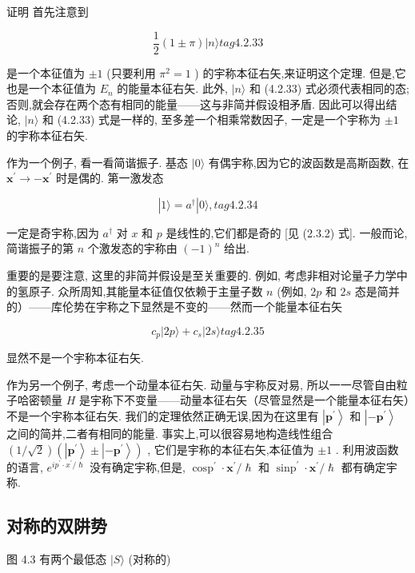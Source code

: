 证明 首先注意到

$$
\frac{1}{2}\left( {1 \pm \pi }\right) |n\rangle tag{4. 2.33}
$$

是一个本征值为 $\pm 1$ (只要利用 ${\pi }^{2} = 1$ ) 的宇称本征右矢,来证明这个定理. 但是,它也是一个本征值为 ${E}_{n}$ 的能量本征右矢. 此外, $|n\rangle$ 和 (4.2.33) 式必须代表相同的态; 否则,就会存在两个态有相同的能量——这与非简并假设相矛盾. 因此可以得出结论, $|n\rangle$ 和 (4.2.33) 式是一样的, 至多差一个相乘常数因子, 一定是一个宇称为 $\pm 1$ 的宇称本征右矢.

作为一个例子, 看一看简谐振子. 基态 $|0\rangle$ 有偶宇称,因为它的波函数是高斯函数, 在 ${\mathbf{x}}^{\prime } \rightarrow - {\mathbf{x}}^{\prime }$ 时是偶的. 第一激发态

$$
\left| {1\rangle = {a}^{ \dagger }}\right| 0\rangle , tag{4. 2.34}
$$

一定是奇宇称,因为 ${a}^{ \dagger }$ 对 $x$ 和 $p$ 是线性的,它们都是奇的 [见 (2.3.2) 式]. 一般而论, 简谐振子的第 $n$ 个激发态的宇称由 ${\left( -1\right) }^{n}$ 给出.

重要的是要注意, 这里的非简并假设是至关重要的. 例如, 考虑非相对论量子力学中的氢原子. 众所周知,其能量本征值仅依赖于主量子数 $n$ (例如, ${2p}$ 和 ${2s}$ 态是简并的）——库伦势在宇称之下显然是不变的——然而一个能量本征右矢

$$
{c}_{p}\left| {{2p}\rangle + {c}_{s}}\right| {2s}\rangle tag{4. 2.35}
$$

显然不是一个宇称本征右矢.

作为另一个例子, 考虑一个动量本征右矢. 动量与宇称反对易, 所以一一尽管自由粒子哈密顿量 $H$ 是宇称下不变量——动量本征右矢（尽管显然是一个能量本征右矢）不是一个宇称本征右矢. 我们的定理依然正确无误,因为在这里有 $\left| {\mathbf{p}}^{\prime }\right\rangle$ 和 $\left| {-{\mathbf{p}}^{\prime }}\right\rangle$ 之间的简并,二者有相同的能量. 事实上,可以很容易地构造线性组合 $\left( {1/\sqrt{2}}\right) \left( {\left| {\mathbf{p}}^{\prime }\right\rangle \pm \left| {-{\mathbf{p}}^{\prime }}\right\rangle }\right)$ , 它们是宇称的本征右矢,本征值为 $\pm 1$ . 利用波函数的语言, ${e}^{i{p}^{\prime } \cdot {x}^{\prime }/\hslash }$ 没有确定宇称,但是, ${\operatorname{cosp}}^{\prime } \cdot {\mathbf{x}}^{\prime }/\hslash$ 和 ${\operatorname{sinp}}^{\prime } \cdot {\mathbf{x}}^{\prime }/\hslash$ 都有确定宇称.

\subsection{对称的双阱势}

图 4.3 有两个最低态 $|S\rangle$ (对称的)

